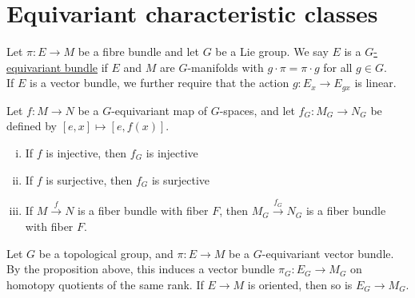 \begin{comment}
	
\section{BRST Model}
In the context of topological field theories, another model of equivariant
cohomlogy arises naturally, called the BRST model. As a vector space, it is
identical to the Weil model $W(\mathfrak{g})\otimes \Omega(M)$, but with
differential $d_B = d_W + \theta^i\otimes \mathcal{L}_i - u^i \otimes \iota_i$.

It was shown by Kalkman that the BRST and Weil models are related by the algebra
automorphism of conjugation by $\exp (\theta^i \iota_i)$. 

\end{comment}

\section{Equivariant characteristic classes}
\begin{defn} %
	Let $\pi: E\to M$ be a fibre bundle and let $G$ be a Lie group. We say $E$
	is a \underline{$G$-equivariant bundle} if $E$ and  $M$ are 
	$G$-manifolds  with $g \cdot \pi = \pi \cdot g$ for all  $g\in G$.\\
	If  $E$ is a vector bundle, we further require that the action  $g: E_x \to
	E_{gx}$ is linear.
\end{defn}

\begin{prop} %
	Let $f:M\to N$ be a $G$-equivariant map of  $G$-spaces, and let
	$f_G:M_G\to N_G$ be defined by $[e,x]\mapsto [e,f(x)]$. 
	\begin{enumerate}[(i)]
	    \item If $f$ is injective, then $f_G$ is injective
		\item If $f$ is surjective, then $f_G$ is surjective
		\item If $M\xrightarrow{f} N$ is a fiber bundle with fiber $F$, then
			$M_G\xrightarrow{f_G}N_G$ is a fiber bundle with fiber  $F$. 	
	\end{enumerate}
\end{prop}

Let $G$ be a topological group, and  $\pi : E\to M$ be a  $G$-equivariant vector
bundle. By the proposition above, this induces a vector bundle  $\pi_G : E_G\to
M_G$ on homotopy quotients of the same rank. If $E\to M$ is oriented, then so is
$E_G \to M_G$. 

